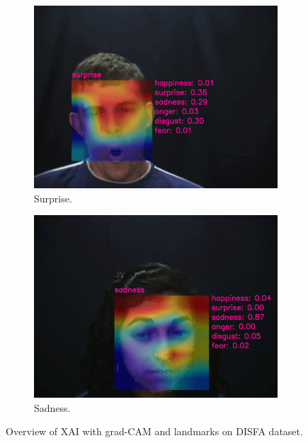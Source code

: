 \begin{figure}[ht]
\begin{subfigure}{0.49\linewidth}
    \includegraphics[width=\linewidth]{GiMeFive03.png}
    \caption{Surprise.}
    \label{fig:v3}
  \end{subfigure}
  \hfill
  \begin{subfigure}{0.49\linewidth}
    \includegraphics[width=\linewidth]{GiMeFive04.png}
    \caption{Sadness.}
    \label{fig:v4}
  \end{subfigure}
  \caption{Overview of XAI with grad-CAM and landmarks on DISFA dataset.}
  \label{fig:video}
\end{figure}

